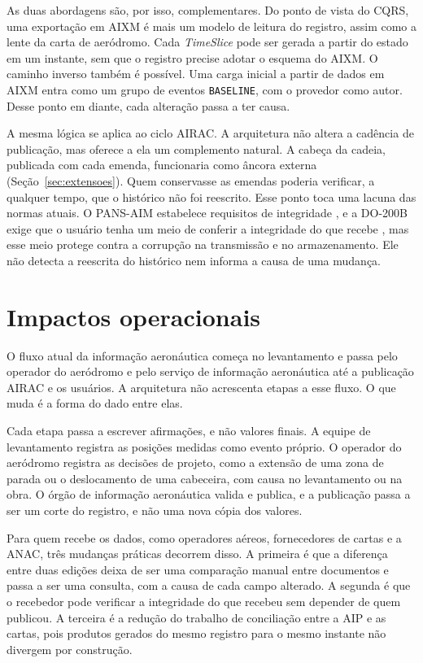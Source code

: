 As duas abordagens são, por isso, complementares. Do ponto de vista do CQRS, uma exportação em AIXM é mais um modelo de leitura do registro, assim como a lente da carta de aeródromo. Cada \textit{TimeSlice} pode ser gerada a partir do estado em um instante, sem que o registro precise adotar o esquema do AIXM. O caminho inverso também é possível. Uma carga inicial a partir de dados em AIXM entra como um grupo de eventos \texttt{BASELINE}, com o provedor como autor. Desse ponto em diante, cada alteração passa a ter causa.

A mesma lógica se aplica ao ciclo AIRAC. A arquitetura não altera a cadência de publicação, mas oferece a ela um complemento natural. A cabeça da cadeia, publicada com cada emenda, funcionaria como âncora externa (Seção~\ref{sec:extensoes}). Quem conservasse as emendas poderia verificar, a qualquer tempo, que o histórico não foi reescrito. Esse ponto toca uma lacuna das normas atuais. O PANS-AIM estabelece requisitos de integridade \cite{icao2018pansaim}, e a DO-200B exige que o usuário tenha um meio de conferir a integridade do que recebe \cite{rtca2015do200b}, mas esse meio protege contra a corrupção na transmissão e no armazenamento. Ele não detecta a reescrita do histórico nem informa a causa de uma mudança.

\section{Impactos operacionais}\label{sec:disc-impactos}

O fluxo atual da informação aeronáutica começa no levantamento e passa pelo operador do aeródromo e pelo serviço de informação aeronáutica até a publicação AIRAC e os usuários. A arquitetura não acrescenta etapas a esse fluxo. O que muda é a forma do dado entre elas.

Cada etapa passa a escrever afirmações, e não valores finais. A equipe de levantamento registra as posições medidas como evento próprio. O operador do aeródromo registra as decisões de projeto, como a extensão de uma zona de parada ou o deslocamento de uma cabeceira, com causa no levantamento ou na obra. O órgão de informação aeronáutica valida e publica, e a publicação passa a ser um corte do registro, e não uma nova cópia dos valores.

Para quem recebe os dados, como operadores aéreos, fornecedores de cartas e a ANAC, três mudanças práticas decorrem disso. A primeira é que a diferença entre duas edições deixa de ser uma comparação manual entre documentos e passa a ser uma consulta, com a causa de cada campo alterado. A segunda é que o recebedor pode verificar a integridade do que recebeu sem depender de quem publicou. A terceira é a redução do trabalho de conciliação entre a AIP e as cartas, pois produtos gerados do mesmo registro para o mesmo instante não divergem por construção.

